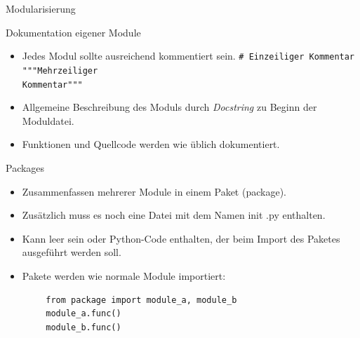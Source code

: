 \documentclass[utf8, smaller, c]{beamer}
\renewcommand{\tt}[1]{{\texttt{#1}}}
\begin{document}
\begin{frame}{Modularisierung}
	\begin{block}{Dokumentation eigener Module}
		\begin{itemize}
			\item Jedes Modul sollte ausreichend kommentiert sein.\newline
			\verb|# Einzeiliger Kommentar| \newline
			\verb|"""Mehrzeiliger| \\ \verb|Kommentar"""|
			\item Allgemeine Beschreibung des Moduls durch \textit{Docstring} zu Beginn der Moduldatei.
			\item Funktionen und Quellcode werden wie üblich dokumentiert.
		\end{itemize}
	\end{block}
	
	\pagebreak
	
	\begin{block}{Packages}
		\begin{itemize}
			\item Zusammenfassen mehrerer Module in einem Paket (package).
			\item Zusätzlich muss es noch eine Datei mit dem Namen \textunderscore\textunderscore init
			\textunderscore\textunderscore.py enthalten.
			\item Kann leer sein oder Python-Code enthalten, der beim Import des Paketes ausgeführt werden soll.
			\item Pakete werden wie normale Module importiert:
		\end{itemize}
		\begin{lstlisting}
		from package import module_a, module_b
		module_a.func()
		module_b.func()
		\end{lstlisting}
	\end{block}
\end{frame}

\end{document}
